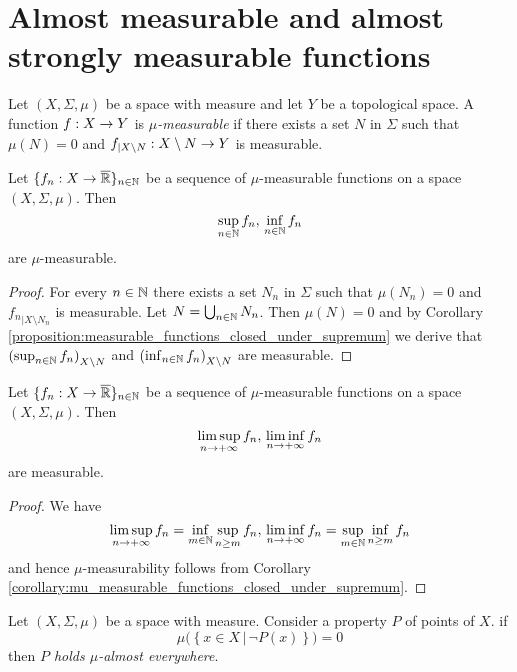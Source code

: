 \section{Almost measurable and almost strongly measurable functions}

\begin{definition}
Let $(X,\Sigma,\mu)$ be a space with measure and let $Y$ be a topological space. A function $f:X\rightarrow Y$ is \textit{$\mu$-measurable} if there exists a set $N$ in $\Sigma$ such that $\mu(N) = 0$ and $f_{\mid X\setminus N}:X\setminus N\rightarrow Y$ is measurable.
\end{definition}

\begin{corollary}\label{corollary:mu_measurable_functions_closed_under_supremum}
Let $\{f_n:X\rightarrow \overline{{\mathbb R}}\}_{n\in {\mathbb N}}$ be a sequence of $\mu$-measurable functions on a space $(X,\Sigma,\mu)$. Then
$$\sup_{n\in {\mathbb N}}f_n,\,\inf_{n\in {\mathbb N}}f_n$$
are $\mu$-measurable.
\end{corollary}
\begin{proof}
For every $n\in {\mathbb N}$ there exists a set $N_n$ in $\Sigma$ such that $\mu(N_n) = 0$ and ${f_n}_{\mid X\setminus N_n}$ is measurable. Let $N = \bigcup_{n\in {\mathbb N}}N_n$. Then $\mu(N) = 0$ and by Corollary \ref{proposition:measurable_functions_closed_under_supremum} we derive that $\left(\sup_{n\in {\mathbb N}}f_n\right)_{X\setminus N}$ and $\left(\inf_{n\in {\mathbb N}}f_n\right)_{X\setminus N}$ are measurable.
\end{proof}

\begin{corollary}\label{corollary:mu_measurable_closed_under_upper_limits}
Let $\{f_n:X\rightarrow \overline{{\mathbb R}}\}_{n\in {\mathbb N}}$ be a sequence of $\mu$-measurable functions on a space $(X,\Sigma,\mu)$. Then
$$\limsup_{n\rightarrow +\infty}f_n,\,\liminf_{n\rightarrow +\infty}f_n$$
are measurable.
\end{corollary}
\begin{proof}
We have
$$\limsup_{n\rightarrow +\infty}f_n =\inf_{m\in {\mathbb N}}\sup_{n\geq m}f_n,\,\liminf_{n\rightarrow +\infty}f_n = \sup_{m\in {\mathbb N}}\inf_{n\geq m}f_n$$
and hence $\mu$-measurability follows from Corollary \ref{corollary:mu_measurable_functions_closed_under_supremum}.
\end{proof}

\begin{definition}
Let $(X,\Sigma,\mu)$ be a space with measure. Consider a property $P$ of points of $X$. if
$$\mu\bigg(\left\{x\in X\,|\,\neg P(x)\right\}\bigg) = 0$$
then \textit{$P$ holds $\mu$-almost everywhere}.
\end{definition}

